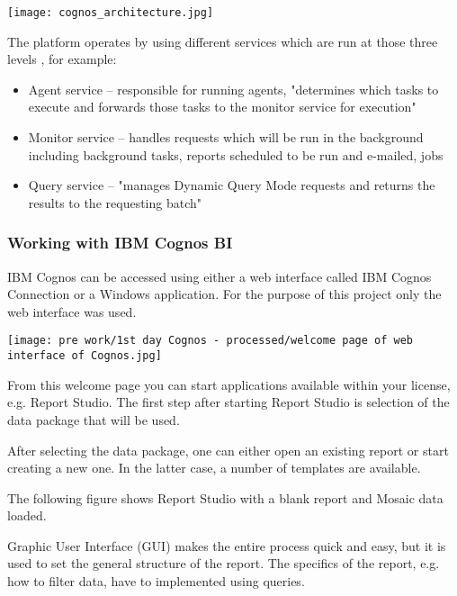 \begin{center}
  \texttt{[image: cognos\_architecture.jpg]}
\end{center}


The platform operates by using different services which are run at those three levels \citep{Browne2010}, for example:
\begin{itemize}
\item Agent service – responsible for running agents, "determines which tasks to execute and forwards those tasks to the monitor service for execution"
\item Monitor service – handles requests which will be run in the background including background tasks, reports scheduled to be run and e-mailed, jobs
\item Query service – "manages Dynamic Query Mode requests and returns the results to the requesting batch"
\end{itemize}
		
			
			\subsubsection{Working with IBM Cognos BI}
			
IBM Cognos can be accessed using either a web interface called IBM Cognos Connection or a Windows application. For the purpose of this project only the web interface was used.

\begin{center}
  \texttt{[image: pre work/1st day Cognos - processed/welcome page of web interface of Cognos.jpg]}
\end{center}


From this welcome page you can start applications available within your license, e.g. Report Studio. The first step after starting Report Studio is selection of the data package that will be used.


After selecting the data package, one can either open an existing report or start creating a new one. In the latter case, a number of templates are available.


The following figure shows Report Studio with a blank report and Mosaic data loaded.


Graphic User Interface (GUI) makes the entire process quick and easy, but it is used to set the general structure of the report. The specifics of the report, e.g. how to filter data, have to implemented using queries.

